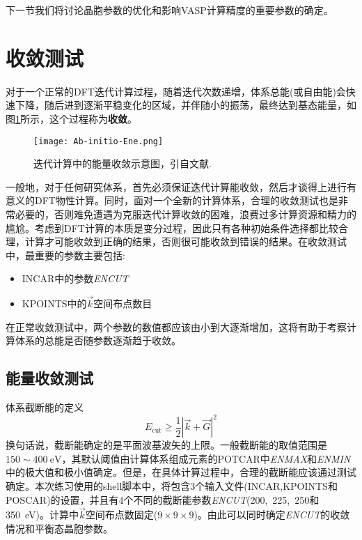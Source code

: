 下一节我们将讨论晶胞参数的优化和影响\textrm{VASP}计算精度的重要参数的确定。
\section{收敛测试}\label{Sec:convergence}
对于一个正常的\textrm{DFT}迭代计算过程，随着迭代次数递增，体系总能(或自由能)会快速下降，随后进到逐渐平稳变化的区域，并伴随小的振荡，最终达到基态能量，如图\ref{Fig:convergence}所示，这个过程称为\textbf{收敛}。
\begin{figure}[h!]
\centering
\texttt{[image: Ab-initio-Ene.png]}
\caption{\small 迭代计算中的能量收敛示意图，引自文献.}%
\label{Fig:convergence}
\end{figure}

一般地，对于任何研究体系，首先必须保证迭代计算能收敛，然后才谈得上进行有意义的\textrm{DFT}物性计算。同时，面对一个全新的计算体系，合理的收敛测试也是非常必要的，否则难免遭遇为克服迭代计算收敛的困难，浪费过多计算资源和精力的尴尬。考虑到\textrm{DFT}计算的本质是变分过程，因此只有各种初始条件选择都比较合理，计算才可能收敛到正确的结果，否则很可能收敛到错误的结果。在收敛测试中，最重要的参数主要包括:
\begin{itemize}
	\item \textrm{INCAR}中的参数\textit{ENCUT}
	\item \textrm{KPOINTS}中的$\vec k$空间布点数目
\end{itemize}
在正常收敛测试中，两个参数的数值都应该由小到大逐渐增加，这将有助于考察计算体系的总能是否随参数逐渐趋于收敛。
\subsection{能量收敛测试}
体系截断能的定义
\begin{equation}
	E_{\mathrm{cut}}\geqslant\dfrac12|\vec k+\vec G|^2
	\label{eq:Ecut}
\end{equation}
换句话说，截断能确定的是平面波基波矢的上限。一般截断能的取值范围是$150\sim400\mathrm{~eV}$，其默认阈值由计算体系组成元素的\textrm{POTCAR}中\textit{ENMAX}和\textit{ENMIN}中的极大值和极小值确定。但是，在具体计算过程中，合理的截断能应该通过测试确定。本次练习使用的\textrm{shell}脚本中，将包含3个输入文件(\textrm{INCAR},\textrm{KPOINTS}和\textrm{POSCAR})的设置，并且有4个不同的截断能参数\textit{ENCUT}(200,~225,~250和350\textrm{~eV})。计算中$\vec k$空间布点数固定($9\times9\times9$)。由此可以同时确定\textit{ENCUT}的收敛情况和平衡态晶胞参数。
